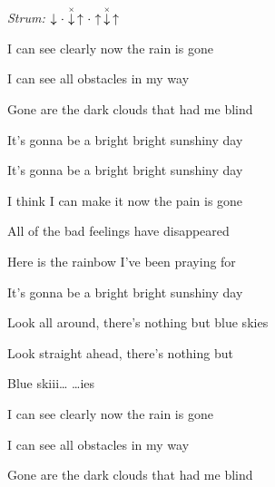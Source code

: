 \begin{song}


\begin{headerbox}
\RaiseBoxWithChucks
\textit{Strum:} $\Down\Miss\ChuckDown\Up\Miss\Up\ChuckDown\Up$
\end{headerbox}

\begin{hchordbox}
\end{hchordbox}

\Large

\bigskip

 I can see clearly now the rain is gone \par
{} I can see all obstacles in my way \par
{} Gone are the dark clouds that had me blind \par
It's gonna be a bright  bright  sunshiny day \par
It's gonna be a bright  bright  sunshiny day \par

\bigskip

 I think I can make it now the pain is gone \par
{} All of the bad feelings have disappeared \par
{} Here is the rainbow I've been praying for \par
It's gonna be a bright  bright  sunshiny day \par

\bigskip

 Look all around, there's nothing but blue skies \par
{} Look straight ahead, there's nothing but \par
{}Blue skiii…      …ies \par

\bigskip

 I can see clearly now the rain is gone \par
{} I can see all obstacles in my way \par
{} Gone are the dark clouds that had me blind \par


\end{song}
